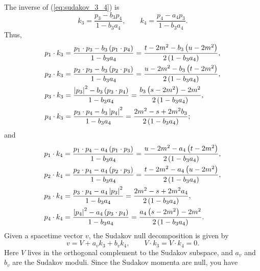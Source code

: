 The inverse of (\ref{eq:sudakov_3_4}) is
\begin{equation}
	k_{3} = \frac{p_{3} - b_{3} p_{4}}{1 - b_{3} a_{4}}, \qquad k_{4} = \frac{p_{4} - a_{4} p_{3}}{1 - b_{3} a_{4}}.
\end{equation}
Thus,
\begin{align}
	p_{1} \cdot k_{3} &= \frac{p_{1} \cdot p_{3} - b_{3} \left( p_{1} \cdot p_{4} \right)}{1 - b_{3} a_{4}} = \frac{ t - 2m^{2} - b_{3} \left( u - 2m^{2} \right) }{2 \left(1 - b_{3} a_{4} \right)}, \\
	p_{2} \cdot k_{3} &= \frac{p_{2} \cdot p_{3} - b_{3} \left( p_{2} \cdot p_{4} \right)}{1 - b_{3} a_{4}} = \frac{ u - 2m^{2} - b_{3} \left( t - 2m^{2} \right) }{2 \left(1 - b_{3} a_{4} \right)}, \\
	p_{3} \cdot k_{3} &= \frac{\left\lvert p_{3} \right\rvert^{2} - b_{3} \left( p_{3} \cdot p_{4} \right)}{1 - b_{3} a_{4}} = \frac{ b_{3} \left( s - 2m^{2} \right) - 2m^{2} }{2 \left(1 - b_{3} a_{4} \right)}, \\
	p_{4} \cdot k_{3} &= \frac{p_{3} \cdot p_{4} - b_{3} \left\lvert p_{4} \right\rvert^{2}}{1 - b_{3} a_{4}} = \frac{ 2m^{2} - s + 2m^{2} b_{3}}{2 \left(1 - b_{3} a_{4} \right)};
\end{align}
and
\begin{align}
	p_{1} \cdot k_{4} &= \frac{p_{1} \cdot p_{4} - a_{4} \left( p_{1} \cdot p_{3} \right)}{1 - b_{3} a_{4}} = \frac{u - 2m^{2} - a_{4} \left(t - 2m^{2} \right)}{2 \left( 1 - b_{3} a_{4} \right)}, \\
	p_{2} \cdot k_{4} &= \frac{p_{2} \cdot p_{4} - a_{4} \left( p_{2} \cdot p_{3} \right)}{1 - b_{3} a_{4}} = \frac{t - 2m^{2} - a_{4} \left( u - 2m^{2} \right)}{2 \left( 1 - b_{3} a_{4} \right)}, \\
	p_{3} \cdot k_{4} &= \frac{p_{3} \cdot p_{4} - a_{4} \left\lvert p_{3} \right\rvert^{2}}{1 - b_{3} a_{4}} = \frac{2m^{2} - s + 2m^{2} a_{4}}{2 \left( 1 - b_{3} a_{4} \right)}, \\
	p_{4} \cdot k_{4} &= \frac{ \left\lvert p_{4} \right\rvert^{2} - a_{4} \left( p_{3} \cdot p_{4} \right)}{1 - b_{3} a_{4}} = \frac{a_{4} \left( s - 2m^{2} \right) - 2m^{2}}{2 \left( 1 - b_{3} a_{4} \right)}.
\end{align}
Given a spacetime vector $v$, the Sudakov null decomposition is given by
\begin{equation}
	v = V + a_{v} k_{3} + b_{v} k_{4}, \qquad V \cdot k_{3} = V \cdot k_{4} = 0.
\end{equation}
Here $V$ lives in the orthogonal complement to the Sudakov subspace, and $a_{v}$ and $b_{v}$ are the Sudakov moduli. Since the Sudakov momenta are null, you have

